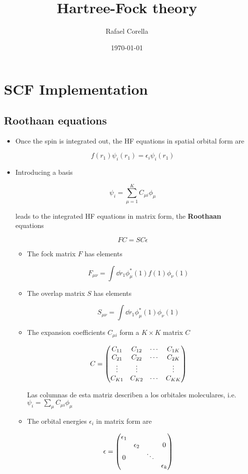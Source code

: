 \documentclass[11pt]{article}
\author{Rafael Corella}
\date{\today}
\title{Hartree-Fock theory}
\begin{document}
\maketitle
\tableofcontents

\section{SCF Implementation}
\label{sec:orga4be61f}

\subsection{Roothaan equations}
\label{sec:org28d081b}

\begin{itemize}
\item Once the spin is integrated out, the HF equations in spatial orbital form are

\[ f(r_1)\psi_i(r_1) = \epsilon_i\psi_i(r_1) \]

\item Introducing a basis

\[ \psi_i = \sum_{\mu = 1}^K C_{\mu i }\phi_{\mu} \]

leads to the integrated HF equations in matrix form, the \textbf{Roothaan} equations

\[ FC = SC\epsilon \]

\begin{itemize}
\item The fock matrix \(F\) has elements

\[ F_{\mu\nu} = \int \dd{r_1}\phi_{\mu}^{* }(1)f(1) \phi_{\nu}(1) \]

\item The overlap matrix \(S\) has elements

\[ S_{\mu\nu} = \int \dd{r_1} \phi_{\mu}^{ * }(1) \phi_{\nu}(1) \]

\item The expansion coefficients \(C_{\mu i}\) form a \(K\times K\) matrix \(C\)

\[ C = \pmqty{C_{11} & C_{12} & \cdots & C_{1K} \\ C_{21} & C_{22} & \cdots & C_{2K} \\ \vdots & \vdots & & \vdots \\ C_{K1} & C_{K2} & \cdots & C_{KK} } \]

Las columnas de esta matriz describen a los orbitales moleculares, i.e. \(\psi_i = \sum_{\mu}C_{\mu i}\phi_{\mu}\)

\item The orbital energies \(\epsilon_i\) in matrix form are

\[ \epsilon = \pmqty{\epsilon_1 & & & \\ & \epsilon_2 & & 0 \\ 0 & & \ddots  \\ &&& \epsilon_k} \]
\end{itemize}
\end{itemize}
\end{document}
